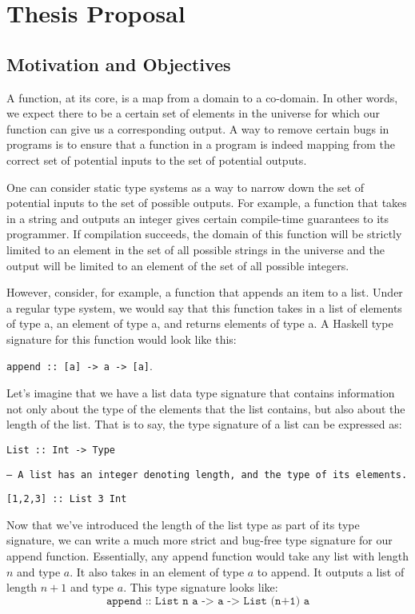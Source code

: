 
\chapter{Thesis Proposal}

\section{Motivation and Objectives}
A function, at its core, is a map from a domain to a co-domain. In other words,
we expect there to be a certain set of elements in the universe for which our
function can give us a corresponding output. A way to remove certain bugs in
programs is to ensure that a function in a program is indeed mapping from the
correct set of potential inputs to the set of potential outputs. 

One can consider static type systems as a way to narrow down the set of
potential inputs to the set of possible outputs. For example, a function that
takes in a string and outputs an integer gives certain compile-time guarantees
to its programmer. If compilation succeeds, the domain of this function will be
strictly limited to an element in the set of all possible strings in the
universe and the output will be limited to an element of the set of all possible
integers. 

However, consider, for example, a function that appends an item to a list. Under
a regular type system, we would say that this function takes in a list of
elements of type a, an element of type a, and returns elements of type a. A
Haskell type signature for this function would look like this: 

\texttt{append :: [a] -> a -> [a]}. 


Let's imagine that we have a list data type signature that contains information
not only about the type of the elements that the list contains, but also about
the length of the list. That is to say, the type signature of a list can be
expressed as: 

\texttt{List :: Int -> Type}

\texttt{-- A list has an integer denoting length, and the type of its elements.}

\texttt{[1,2,3] :: List 3 Int} 


Now that we've introduced the length of the list type as part of its type
signature, we can write a much more strict and bug-free type signature for our
append function. Essentially, any append function would take any list with
length $n$ and type $a$. It also takes in an element of type $a$ to append. It
outputs a list of length $n+1$ and type $a$. This type signature looks like: 
$$
\texttt{append :: List n a -> a -> List (n+1) a}
$$

